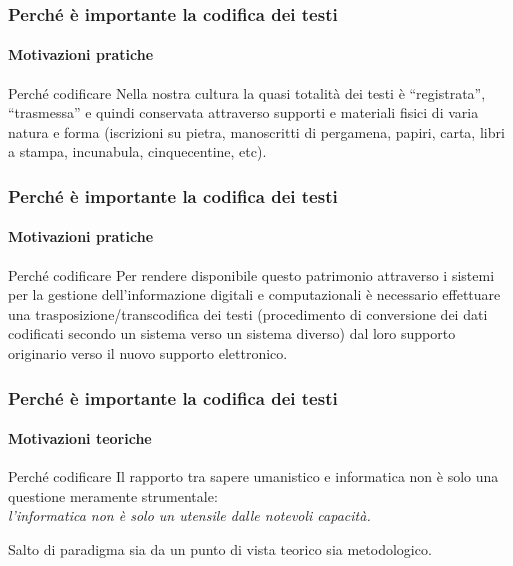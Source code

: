 \begin{frame}
    \frametitle{Perché è importante la codifica dei testi}
    \framesubtitle{Motivazioni pratiche}
    \addtocounter{nframe}{1}
    
    \begin{block}{Perché codificare}
        Nella nostra cultura la quasi totalità dei testi è ``registrata'', ``trasmessa'' e quindi conservata attraverso supporti e materiali fisici di varia natura e forma (iscrizioni su pietra, manoscritti di pergamena, papiri, carta, libri a stampa, incunabula, cinquecentine, etc).
    \end{block}

\end{frame}

\begin{frame}
    \frametitle{Perché è importante la codifica dei testi}
    \framesubtitle{Motivazioni pratiche}
    \addtocounter{nframe}{1}
    
    \begin{block}{Perché codificare}
        Per rendere disponibile questo patrimonio attraverso i sistemi per la gestione dell'informazione digitali e computazionali è necessario effettuare una trasposizione/transcodifica dei testi (procedimento di conversione dei dati codificati secondo un sistema verso un sistema diverso) dal loro supporto originario verso il nuovo supporto elettronico.
    \end{block}

\end{frame}

\begin{frame}
    \frametitle{Perché è importante la codifica dei testi}
    \framesubtitle{Motivazioni teoriche}
    \addtocounter{nframe}{1}
    
    \begin{block}{Perché codificare}
        Il rapporto tra sapere umanistico e informatica non è solo una questione meramente strumentale:\\ 
        \textit{l'informatica non è solo un utensile dalle notevoli capacità.}

        \begin{center}
            Salto di paradigma sia da un punto di vista teorico sia metodologico.
        \end{center} 
    \end{block}

\end{frame}

